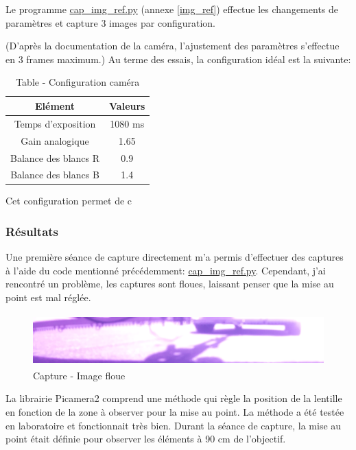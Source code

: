 Le programme \underline{cap\_img\_ref.py} (annexe \ref{img_ref}) effectue les changements de paramètres et capture 3 images par configuration.

(D'après la documentation de la caméra, l'ajustement des paramètres s'effectue en 3 frames maximum.)
Au terme des essais, la configuration idéal est la suivante:

\begin{table}[H]
    \begin{center}
        \caption{Table - Configuration caméra}
        \begin{tabular}{|c|c|}
            Elément              & Valeurs                 \\ \hline
            Temps d'exposition   & 1080 \si{\milli\second} \\
            Gain analogique      & 1.65                    \\
            Balance des blancs R & 0.9                     \\
            Balance des blancs B & 1.4                     \\
        \end{tabular}
    \end{center}
\end{table}

Cet configuration permet de c
\subsubsection{Résultats}
Une première séance de capture directement m'a permis d'effectuer des captures à l'aide du code mentionné précédemment: \underline{cap\_img\_ref.py}. Cependant, j'ai rencontré un problème, les captures sont floues, laissant penser que la mise au point est mal réglée.

\begin{figure}[H]
    \centering
    \includegraphics[height=2cm]{assets/figures/capture_floue.png}
    \caption{Capture - Image floue}
\end{figure}

La librairie Picamera2 \cite{picamera2} comprend une méthode qui règle la position de la lentille en fonction de la zone à observer pour la mise au point. La méthode a été testée en laboratoire et fonctionnait très bien. Durant la séance de capture,
la mise au point était définie pour observer les éléments à 90 \si{\centi\meter} de l'objectif.

